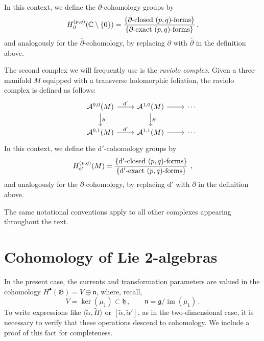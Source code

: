 \documentclass[11pt]{amsart}
\newcommand{\dr}{{\mathrm{d}}}
\numberwithin{equation}{section}
\numberwithin{figure}{section}
\numberwithin{table}{section}
\newcommand{\cA}{\mathcal{A}}
\theoremstyle{thm}
\numberwithin{equation}{subsection}
\theoremstyle{definition}
\theoremstyle{rem}
\begin{document}
In this context, we define the \( \partial \)-cohomology groups by
\begin{equation}
    H_\partial^{(p,q)}(\mathbb{C} \setminus \{0\}) 
    = \frac{ \{ \text{\( \partial \)-closed } (p,q) \text{-forms} \} }
           { \{ \text{\( \partial \)-exact } (p,q) \text{-forms} \} }\,,
\end{equation}
and analogously for the $\bar \partial$-cohomology, by replacing $\partial$ with $\bar \partial$ in the definition above.

The second complex we will frequently use is the \emph{raviolo complex}. Given a three-manifold $M$ equipped with a transverse holomorphic foliation, the raviolo complex is defined as follows:
\begin{equation}
     \begin{tikzcd}
  & \cA^{0,0}(M)  \arrow[r, "\dr'"] \arrow[d, " \partial"] & \cA^{1,0}(M) \arrow[r] \arrow[d, "\partial"] &\cdots \\
   & \cA^{0,1}(M) \arrow[r, "\dr'"] & \cA^{1,1}(M)  \arrow[r] & \cdots
\end{tikzcd}
\end{equation}
In this context, we define the \( \dr' \)-cohomology groups by
\begin{equation}
    H_{\dr'}^{(p,q)}(M) 
    = \frac{ \{ \text{\( \dr' \)-closed } (p,q) \text{-forms} \} }
           { \{ \text{\( \dr' \)-exact } (p,q) \text{-forms} \} }\,\,,
\end{equation}
and analogously for the $ \partial$-cohomology, by replacing $\dr'$ with $ \partial$ in the definition above.

The same notational conventions apply to all other complexes appearing throughout the text. 


\section{Cohomology of Lie 2-algebras}

\label{sec:appendixproof}


In the present case, the currents and transformation parameters are valued in the cohomology \( H^{\bullet}(\mathfrak{G}) = V \oplus \mathfrak{n} \), where, recall,
\begin{equation}
    V = \ker(\mu_1) \subset \mathfrak{h}\,, \qquad \mathfrak{n} = \mathfrak{g} / \operatorname{im}(\mu_1) \,.
\end{equation}
To write expressions like \( \langle \tilde{\alpha}, \tilde{H} \rangle \) or \( [\tilde{\alpha}, \tilde{\alpha}'] \), as in the two-dimensional case, it is necessary to verify that these operations descend to cohomology. We include a proof of this fact for completeness.
\end{document}
